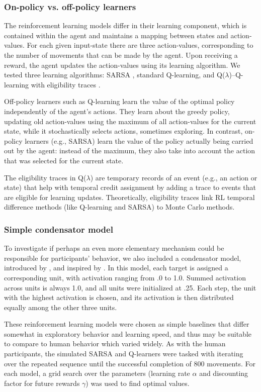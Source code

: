 \documentclass[man,floatsintext]{apa6}
\begin{document}
\subsubsection{On-policy vs. off-policy learners}
The reinforcement learning models differ in their learning component, which is contained within the agent and maintains a mapping between states and action-values. For each given input-state there are three action-values, corresponding to the number of movements that can be made by the agent. Upon receiving a reward, the agent updates the action-values using its learning algorithm. We tested three learning algorithms: SARSA \cite{Rummery94on-lineq-learning}, standard Q-learning, and Q($\lambda$)--Q-learning with eligibility traces \cite{Watkins:1989}. 

Off-policy learners such as Q-learning learn the value of the optimal policy independently of the agent's actions. They learn about the greedy policy, updating old action-values using the maximum of all action-values for the current state, while it stochastically selects actions, sometimes exploring. 
In contrast, on-policy learners (e.g., SARSA) learn the value of the policy actually being carried out by the agent: instead of the maximum, they also take into account the action that was selected for the current state. 

The eligibility traces in Q($\lambda$) are temporary records of an event (e.g., an action or state) that help with temporal credit assignment by adding a trace to events that are eligible for learning updates. Theoretically, eligibility traces link RL temporal difference methods (like Q-learning and SARSA) to Monte Carlo methods.

\subsubsection{Simple condensator model}
To investigate if perhaps an even more elementary mechanism could be responsible for participants' behavior, we also included a condensator model, introduced by , and inspired by . In this model, each target is assigned a corresponding unit, with activation ranging from .0 to 1.0. Summed activation across units is always 1.0, and all units were initialized at .25. Each step, the unit with the highest activation is chosen, and its activation is then distributed equally among the other three units.

These reinforcement learning models were chosen as simple baselines that differ somewhat in exploratory behavior and learning speed, and thus may be suitable to compare to human behavior which varied widely. As with the human participants, the simulated SARSA and Q-learners were tasked with iterating over the repeated sequence until the successful completion of 800 movements. For each model, a grid search over the parameters (learning rate $\alpha$ and discounting factor for future rewards $\gamma$) was used to find optimal values.
\end{document}
